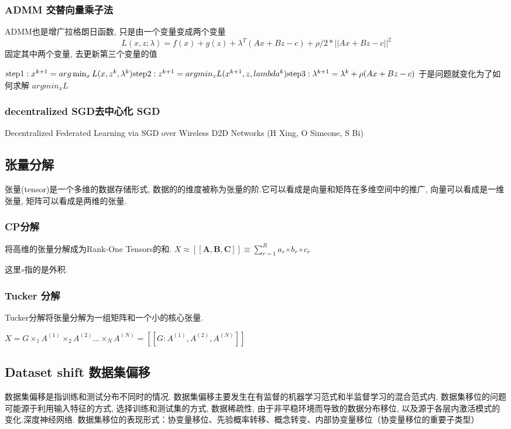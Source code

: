 \subsubsection{ADMM 交替向量乘子法}
ADMM也是增广拉格朗日函数, 只是由一个变量变成两个变量
$$L(x, z;\lambda)= f(x) + g(z) + \lambda ^T(Ax + Bz - c) + \rho/2 * ||Ax + Bz -c ||^2$$
固定其中两个变量, 去更新第三个变量的值

$ \text{step1}: x^{k+1} = arg \min_x L(x, z^k, \lambda^k) \\
\text{step2}: z^{k+1} = arg min_z L(x^{k+1}, z, lambda^k) \\
\text{step3}: \lambda ^ {k+1} = \lambda^k + \rho (Ax + Bz - c) \\$
于是问题就变化为了如何求解 $arg min_x L$
\subsubsection*{decentralized SGD去中心化 SGD}
 

Decentralized Federated Learning via SGD over Wireless D2D Networks (H Xing,  O Simeone,  S Bi)

\subsection{张量分解}
张量(tensor)是一个多维的数据存储形式, 数据的的维度被称为张量的阶.它可以看成是向量和矩阵在多维空间中的推广, 向量可以看成是一维张量, 矩阵可以看成是两维的张量.
\subsubsection{CP分解}
将高维的张量分解成为Rank-One Tensors的和.
$X \approx [ \!  [ \mathbf{A, B, C} ]\!] \equiv \sum_{r=1}^{R}a_r \circ b_r \circ c_r$

这里$\circ$指的是外积.
\subsubsection{Tucker 分解  }

Tucker分解将张量分解为一组矩阵和一个小的核心张量.

 $X = G \times_1 A^{(1)} \times_2  A^{(2)} \dots \times_N A^{(N)}= [\! [  G:A^{(1)},  A^{(2)},  A^{(N)}   ] \! ] $

\subsection{Dataset shift 数据集偏移}
数据集偏移是指训练和测试分布不同时的情况.
数据集偏移主要发生在有监督的机器学习范式和半监督学习的混合范式内.
数据集移位的问题可能源于利用输入特征的方式, 选择训练和测试集的方式, 数据稀疏性, 由于非平稳环境而导致的数据分布移位, 以及源于各层内激活模式的变化.深度神经网络.
数据集移位的表现形式：协变量移位、先验概率转移、概念转变、内部协变量移位（协变量移位的重要子类型）

